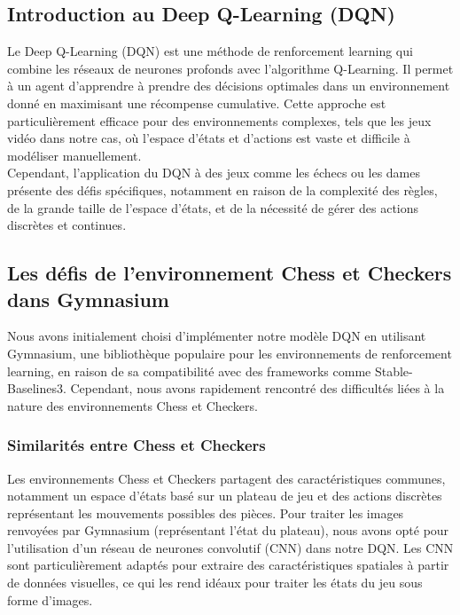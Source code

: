 \documentclass{article}
\begin{document}
\subsection{Introduction au Deep Q-Learning (DQN)}

\quad Le Deep Q-Learning (DQN) est une méthode de renforcement learning qui combine les réseaux de neurones profonds avec l'algorithme Q-Learning. Il permet à un agent d'apprendre à prendre des décisions optimales dans un environnement donné en maximisant une récompense cumulative. Cette approche est particulièrement efficace pour des environnements complexes, tels que les jeux vidéo dans notre cas, où l'espace d'états et d'actions est vaste et difficile à modéliser manuellement.\\

Cependant, l'application du DQN à des jeux comme les échecs ou les dames présente des défis spécifiques, notamment en raison de la complexité des règles, de la grande taille de l'espace d'états, et de la nécessité de gérer des actions discrètes et continues.

\subsection{Les défis de l'environnement Chess et Checkers dans Gymnasium}

\quad Nous avons initialement choisi d'implémenter notre modèle DQN en utilisant Gymnasium, une bibliothèque populaire pour les environnements de renforcement learning, en raison de sa compatibilité avec des frameworks comme Stable-Baselines3. Cependant, nous avons rapidement rencontré des difficultés liées à la nature des environnements Chess et Checkers.

    \subsubsection{Similarités entre Chess et Checkers}

    \quad Les environnements Chess et Checkers partagent des caractéristiques communes, notamment un espace d'états basé sur un plateau de jeu et des actions discrètes représentant les mouvements possibles des pièces. Pour traiter les images renvoyées par Gymnasium (représentant l'état du plateau), nous avons opté pour l'utilisation d'un réseau de neurones convolutif (CNN) dans notre DQN. Les CNN sont particulièrement adaptés pour extraire des caractéristiques spatiales à partir de données visuelles, ce qui les rend idéaux pour traiter les états du jeu sous forme d'images.
\end{document}
